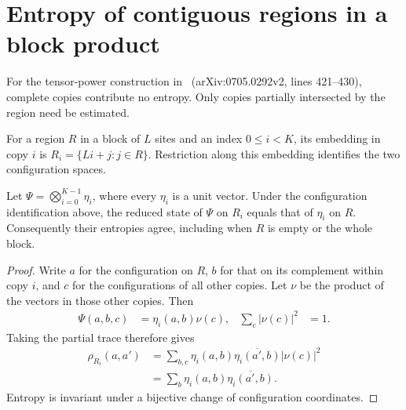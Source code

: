 \section{Entropy of contiguous regions in a block product}

For the tensor-power construction in~\cite{Schuch2008EntropyScaling}
(arXiv:0705.0292v2, lines 421--430), complete copies contribute no entropy.
Only copies partially intersected by the region need be estimated.

\begin{definition}
    \label{def:chain_embedded_copy_region}
    \leanok
    For a region $R$ in a block of $L$ sites and an index $0\le i<K$, its
    embedding in copy $i$ is $R_i=\{Li+j:j\in R\}$.
    Restriction along this embedding identifies the two configuration spaces.
\end{definition}

\begin{lemma}
    \label{thm:chain_copy_region_state}
    \leanok
    Let $\Psi=\bigotimes_{i=0}^{K-1}\eta_i$, where every $\eta_i$ is a unit
    vector. Under the configuration identification above, the reduced state
    of $\Psi$ on $R_i$ equals that of $\eta_i$ on $R$. Consequently their
    entropies agree, including when $R$ is empty or the whole block.
\end{lemma}
\begin{proof}\leanok
    Write $a$ for the configuration on $R$, $b$ for that on its complement
    within copy $i$, and $c$ for the configurations of all other copies.
    Let $\nu$ be the product of the vectors in those other copies. Then
    \begin{align}
        \label{eq:chain_copy_region_coefficients}
        \Psi(a,b,c) & =\eta_i(a,b)\nu(c),
                    & \sum_c|\nu(c)|^2    & =1.
    \end{align}
    Taking the partial trace therefore gives
    \begin{align}
        \label{eq:chain_copy_region_partial_trace}
        \rho_{R_i}(a,a')
         & =\sum_{b,c}\eta_i(a,b)\overline{\eta_i(a',b)}|\nu(c)|^2 \\
         & =\sum_b\eta_i(a,b)\overline{\eta_i(a',b)}.
    \end{align}
    Entropy is invariant under a bijective change of configuration coordinates.
\end{proof}

